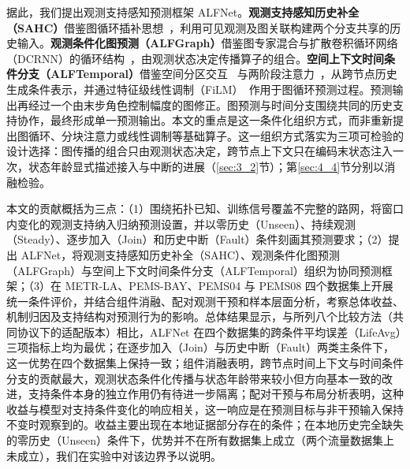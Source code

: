 据此，我们提出观测支持感知预测框架 ALFNet。\textbf{观测支持感知历史补全（SAHC）}借鉴图循环插补思想~\citep{cini2022filling}，利用可见观测及图关联构建两个分支共享的历史输入。\textbf{观测条件化图预测（ALFGraph）}借鉴图专家混合与扩散卷积循环网络（DCRNN）的循环结构~\citep{zhou2025mogernn,li2018diffusion}，由观测状态决定传播算子的组合。\textbf{空间上下文时间条件分支（ALFTemporal）}借鉴空间分区交互~\citep{fang2025efficient} 与两阶段注意力~\citep{zhang2023crossformer}，从跨节点历史生成条件表示，并通过特征级线性调制（FiLM）~\citep{perez2018film}作用于图循环预测过程。预测输出再经过一个由末步角色控制幅度的图修正。图预测与时间分支围绕共同的历史支持协作，最终形成单一预测输出。本文的重点是这一条件化组织方式，而非重新提出图循环、分块注意力或线性调制等基础算子。这一组织方式落实为三项可检验的设计选择：图传播的组合只由观测状态决定，跨节点上下文只在编码末状态注入一次，状态年龄显式描述接入与中断的进展（\ref{sec:3_2}节）；第\ref{sec:4_4}节分别以消融检验。

本文的贡献概括为三点：（1）围绕拓扑已知、训练信号覆盖不完整的路网，将窗口内变化的观测支持纳入归纳预测设置，并以零历史（Unseen）、持续观测（Steady）、逐步加入（Join）和历史中断（Fault）条件刻画其预测要求；（2）提出 ALFNet，将观测支持感知历史补全（SAHC）、观测条件化图预测（ALFGraph）与空间上下文时间条件分支（ALFTemporal）组织为协同预测框架；（3）在 METR-LA、PEMS-BAY、PEMS04 与 PEMS08 四个数据集上开展统一条件评价，并结合组件消融、配对观测干预和样本层面分析，考察总体收益、机制归因及支持结构对预测行为的影响。总体结果显示，与所列八个比较方法（共同协议下的适配版本）相比，ALFNet 在四个数据集的跨条件平均误差（LifeAvg）三项指标上均为最优；在逐步加入（Join）与历史中断（Fault）两类主条件下，这一优势在四个数据集上保持一致；组件消融表明，跨节点时间上下文与时间条件分支的贡献最大，观测状态条件化传播与状态年龄带来较小但方向基本一致的改进，支持条件本身的独立作用仍有待进一步隔离；配对干预与布局分析表明，这种收益与模型对支持条件变化的响应相关，这一响应是在预测目标与非干预输入保持不变时观察到的。收益主要出现在本地证据部分存在的条件；在本地历史完全缺失的零历史（Unseen）条件下，优势并不在所有数据集上成立（两个流量数据集上未成立），我们在实验中对该边界予以说明。
